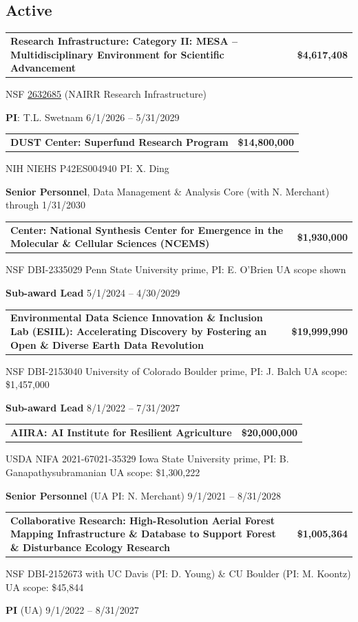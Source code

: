 \documentclass[11pt,letterpaper]{article}
\makeatletter
\newcommand{\grant}[4]{%
  \begin{tabularx}{\linewidth}{@{}X r@{}}
    \textbf{#1} & {\small\bfseries #2}
  \end{tabularx}\par
  {\small\color{muted}#3\par #4\par}\vspace{5pt}}
\makeatother
\begin{document}
\subsection{Active}
\grant{Research Infrastructure: Category II: MESA -- Multidisciplinary Environment for Scientific Advancement}{\$4,617,408}
  {NSF \href{https://www.nsf.gov/awardsearch/show-award/?AWD_ID=2632685}{2632685} (NAIRR Research Infrastructure)}
  {\textbf{PI}: T.L. Swetnam \textbullet{} 6/1/2026 -- 5/31/2029}
\grant{DUST Center: Superfund Research Program}{\$14,800,000}
  {NIH NIEHS P42ES004940 \textbullet{} PI: X. Ding}
  {\textbf{Senior Personnel}, Data Management \& Analysis Core (with N. Merchant) \textbullet{} through 1/31/2030}
\grant{Center: National Synthesis Center for Emergence in the Molecular \& Cellular Sciences (NCEMS)}{\$1,930,000}
  {NSF DBI-2335029 \textbullet{} Penn State University prime, PI: E. O'Brien \textbullet{} UA scope shown}
  {\textbf{Sub-award Lead} \textbullet{} 5/1/2024 -- 4/30/2029}
\grant{Environmental Data Science Innovation \& Inclusion Lab (ESIIL): Accelerating Discovery by Fostering an Open \& Diverse Earth Data Revolution}{\$19,999,990}
  {NSF DBI-2153040 \textbullet{} University of Colorado Boulder prime, PI: J. Balch \textbullet{} UA scope: \$1,457,000}
  {\textbf{Sub-award Lead} \textbullet{} 8/1/2022 -- 7/31/2027}
\grant{AIIRA: AI Institute for Resilient Agriculture}{\$20,000,000}
  {USDA NIFA 2021-67021-35329 \textbullet{} Iowa State University prime, PI: B. Ganapathysubramanian \textbullet{} UA scope: \$1,300,222}
  {\textbf{Senior Personnel} (UA PI: N. Merchant) \textbullet{} 9/1/2021 -- 8/31/2028}
\grant{Collaborative Research: High-Resolution Aerial Forest Mapping Infrastructure \& Database to Support Forest \& Disturbance Ecology Research}{\$1,005,364}
  {NSF DBI-2152673 \textbullet{} with UC Davis (PI: D. Young) \& CU Boulder (PI: M. Koontz) \textbullet{} UA scope: \$45,844}
  {\textbf{PI} (UA) \textbullet{} 9/1/2022 -- 8/31/2027}
\end{document}
